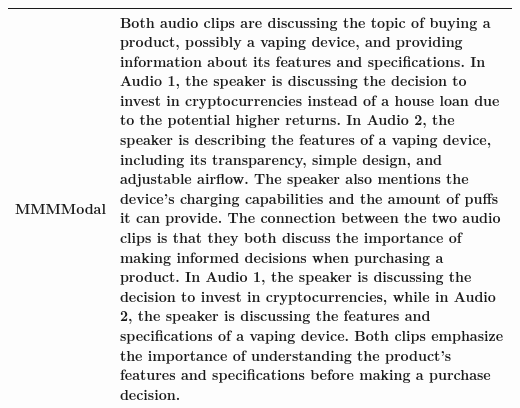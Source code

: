 \documentclass[preprint]{article}
\begin{document}
\begin{table}[hbt!]
\begin{tabular}{p{6.5cm} p{6.5cm}}
    MMMModal                                                                                                                                                                                                                                                                                                                                                                                                                                                                                                                                                                                                                                                                             & Both audio clips are discussing the topic of buying a product, possibly a vaping device, and providing information about its features and specifications. In Audio 1, the speaker is discussing the decision to invest in cryptocurrencies instead of a house loan due to the potential higher returns. In Audio 2, the speaker is describing the features of a vaping device, including its transparency, simple design, and adjustable airflow. The speaker also mentions the device's charging capabilities and the amount of puffs it can provide. The connection between the two audio clips is that they both discuss the importance of making informed decisions when purchasing a product. In Audio 1, the speaker is discussing the decision to invest in cryptocurrencies, while in Audio 2, the speaker is discussing the features and specifications of a vaping device. Both clips emphasize the importance of understanding the product's features and specifications before making a purchase decision. \\
    \hline
  \end{tabular}
\end{table}
\end{document}
